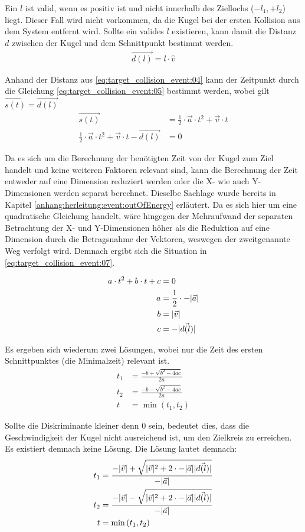 Ein $l$ ist valid, wenn es positiv ist und nicht innerhalb des Ziellochs ($-l_1, +l_2$) liegt.
Dieser Fall wird nicht vorkommen, da die Kugel bei der ersten Kollision aus dem System entfernt wird.
Sollte ein valides $l$ existieren, kann damit die Distanz $d$ zwischen der Kugel und dem Schnittpunkt bestimmt werden.
\begin{align}
    \vec{d(l)} = l \cdot \hat{v}\label{eq:target_collision_event:04}
\end{align}

Anhand der Distanz aus \ref{eq:target_collision_event:04} kann der Zeitpunkt durch die Gleichung \ref{eq:target_collision_event:05}
bestimmt werden, wobei gilt $\vec{s(t)} = \vec{d(l)}$
\begin{align}
    \vec{s(t)} &= \frac{1}{2} \cdot \vec{a} \cdot t^2 + \vec{v} \cdot t\\\label{eq:target_collision_event:05}
    \frac{1}{2} \cdot \vec{a} \cdot t^2 + \vec{v} \cdot t - \vec{d(l)} &= 0
\end{align}

Da es sich um die Berechnung der benötigten Zeit von der Kugel zum Ziel handelt und keine weiteren Faktoren relevant sind,
kann die Berechnung der Zeit entweder auf eine Dimension reduziert werden oder die X- wie auch Y-Dimensionen werden separat
berechnet. Dieselbe Sachlage wurde bereits in Kapitel \ref{anhang:herleitung:event:outOfEnergy} erläutert. Da es sich
hier um eine quadratische Gleichung handelt, wäre hingegen der Mehraufwand der separaten Betrachtung der X- und Y-Dimensionen
höher als die Reduktion auf eine Dimension durch die Betragsnahme der Vektoren, weswegen der zweitgenannte Weg verfolgt
wird. Demnach ergibt sich die Situation in \ref{eq:target_collision_event:07}.

\begin{align}
    a \cdot t^2 + b \cdot t + c &= 0\\\label{eq:target_collision_event:07}
    a &= \frac{1}{2} \cdot -\lvert \vec{a} \rvert\\
    b &= \lvert \vec{v} \rvert\\
    c &= -\lvert \vec{d(l)} \rvert
\end{align}

Es ergeben sich wiederum zwei Lösungen, wobei nur die Zeit des ersten Schnittpunktes (die Minimalzeit) relevant ist.
\begin{align}
    t_1 &= \frac{-b + \sqrt{b^2 - 4ac}}{2a}\\
    t_2 &= \frac{-b - \sqrt{b^2 - 4ac}}{2a}\\
    t &= \min{(t_1, t_2)}
\end{align}

Sollte die Diskriminante kleiner denn $0$ sein, bedeutet dies, dass die Geschwindigkeit der Kugel nicht ausreichend
ist, um den Zielkreis zu erreichen. Es existiert demnach keine Lösung. Die Lösung lautet demnach:
\begin{align}
    t_1 &= \frac{-\lvert \vec{v} \rvert + \sqrt{\lvert \vec{v} \rvert^2 + 2 \cdot -\lvert \vec{a} \rvert \lvert \vec{d(l)} \rvert}}{-\lvert \vec{a} \rvert}\\
    t_2 &= \frac{-\lvert \vec{v} \rvert - \sqrt{\lvert \vec{v} \rvert^2 + 2 \cdot -\lvert \vec{a} \rvert \lvert \vec{d(l)} \rvert}}{-\lvert \vec{a} \rvert}\\
    t &= \min{(t_1, t_2)}
\end{align}